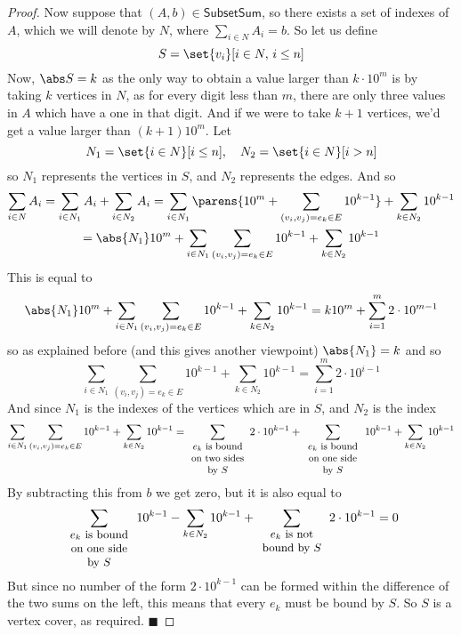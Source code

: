\documentclass[10pt]{article}
\def\undersumtext#1{\vtop{\hsize=2cm\relax\centering\small #1}}
\def\subsum{\mathsf{SubsetSum}}
\def\qed{%
    \ifmmode%
        \eqno\blacksquare%
    \else%
        \hskip1cm\allowbreak\hbox{}\nobreak\hfill$\blacksquare$%
    \fi%
}
\begin{document}
\begin{proof}
    Now suppose that $(A,b)\in\subsum$, so there exists a set of indexes of $A$, which we will denote by $N$, where $\sum_{i\in N}A_i=b$.
    So let us define
    \[ S = \set{v_i}[i\in N,\,i\leq n] \]
    Now, $\abs S=k$ as the only way to obtain a value larger than $k\cdot10^m$ is by taking $k$ vertices in $N$, as for every digit less than $m$, there are only three values in $A$ which have a one in that
    digit.
    And if we were to take $k+1$ vertices, we'd get a value larger than $(k+1)10^m$.
    Let
    \[ N_1 = \set{i\in N}[i\leq n],\quad N_2=\set{i\in N}[i>n] \]
    so $N_1$ represents the vertices in $S$, and $N_2$ represents the edges.
    And so
    \begin{multline*}
        \sum_{i\in N}A_i = \sum_{i\in N_1}A_i + \sum_{i\in N_2}A_i = \sum_{i\in N_1}\parens{10^m + \sum_{(v_i,v_j)=e_k\in E}10^{k-1}} + \sum_{k\in N_2}10^{k-1}\\
        = \abs{N_1}10^m + \sum_{i\in N_1}\sum_{(v_i,v_j)=e_k\in E}10^{k-1} + \sum_{k\in N_2}10^{k-1}
    \end{multline*}
    This is equal to
    \[ \abs{N_1}10^m + \sum_{i\in N_1}\sum_{(v_i,v_j)=e_k\in E}10^{k-1} + \sum_{k\in N_2}10^{k-1} = k10^m + \sum_{i=1}^m 2\cdot10^{m-1} \]
    so as explained before (and this gives another viewpoint) $\abs{N_1}=k$ and so
    \[ \sum_{i\in N_1}\sum_{(v_i,v_j)=e_k\in E}10^{k-1} + \sum_{k\in N_2}10^{k-1} = \sum_{i=1}^m2\cdot10^{i-1} \]
    And since $N_1$ is the indexes of the vertices which are in $S$, and $N_2$ is the index
    \[ \sum_{i\in N_1}\sum_{(v_i,v_j)=e_k\in E}10^{k-1} + \sum_{k\in N_2}10^{k-1} =
    \sum_{\undersumtext{$e_k$ is bound on two sides by $S$}}2\cdot10^{k-1} + \sum_{\undersumtext{$e_k$ is bound on one side by $S$}}10^{k-1} + \sum_{k\in N_2}10^{k-1} \]
    By subtracting this from $b$ we get zero, but it is also equal to
    \[ \sum_{\undersumtext{$e_k$ is bound on one side by $S$}}10^{k-1} - \sum_{k\in N_2}10^{k-1} + \sum_{\undersumtext{$e_k$ is not bound by $S$}}2\cdot10^{k-1} = 0 \]
    But since no number of the form $2\cdot10^{k-1}$ can be formed within the difference of the two sums on the left, this means that every $e_k$ must be bound by $S$.
    So $S$ is a vertex cover, as required.
    \qed

\end{proof}
\end{document}
